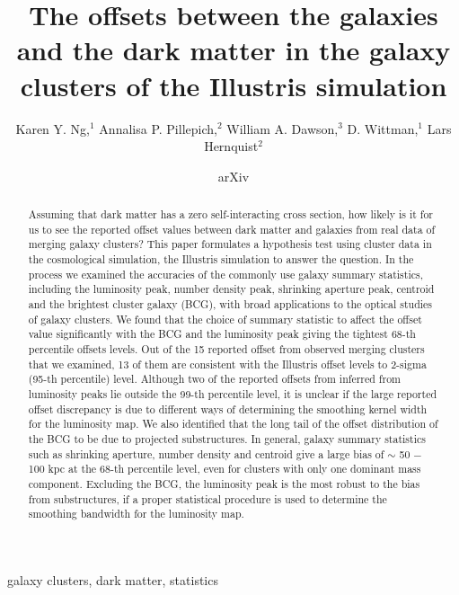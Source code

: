 \documentclass[usenatbib]{mn2e}
\title[
	The offsets between the galaxies and the dark matter in the galaxy clusters of the Illustris simulation]
{The offsets between the galaxies and the dark matter	in the galaxy clusters of
the Illustris simulation}
\author[Karen Y. Ng et al.]{Karen Y. Ng,$^{1}$
	Annalisa P. Pillepich,$^{2}$ 
	William A. Dawson,$^{3}$ 
	D. Wittman,$^{1}$
	\newauthor Lars Hernquist$^{2}$
}
\begin{document}
\date{arXiv} \pagerange{\pageref{firstpage}--\pageref{lastpage}}
 \maketitle\label{firstpage}
\begin{abstract} 
	Assuming that dark matter has a zero self-interacting cross section, how likely is
	it for us to see the reported offset values between dark matter and galaxies 
	from real data of merging galaxy clusters? 
	This paper formulates a hypothesis test using cluster data in the cosmological 
	simulation, the Illustris simulation to answer the question. 
	In the process
	we examined the accuracies of the commonly use galaxy summary 
	statistics, including the
	luminosity peak, number density peak, shrinking aperture peak, centroid and
	the brightest cluster galaxy (BCG), with broad applications to the optical studies of
	galaxy clusters. 	
	We found that the choice of summary statistic to affect the offset
	value significantly with the BCG and the luminosity peak giving the tightest
	68-th percentile offsets levels.  
	Out of the 15 reported offset from observed merging clusters
	that we examined, 13 of
	them are consistent with the Illustris offset levels to 2-sigma 
	(95-th percentile) level. Although two of the reported offsets from inferred
	from luminosity peaks lie outside the 99-th percentile level, it is unclear
	if the large reported offset discrepancy is due to different ways of
	determining the smoothing kernel width for the luminosity map. 
	We also identified that the long
	tail of the offset distribution of the BCG to be due to projected 
	substructures. In general, galaxy summary statistics such as
	shrinking aperture, number density and centroid give a large bias of $\sim$ 50
	$-$ 100 kpc at
	the 68-th percentile level, even for clusters with only one dominant 
	mass component. Excluding the BCG, 
	the luminosity peak is the most 
	robust to the bias from substructures, 
	if a proper statistical procedure is used to determine
	the smoothing bandwidth for the luminosity map.
\end{abstract}

\begin{keywords}
	galaxy clusters, dark matter, statistics 
\end{keywords}





\appendix


\clearpage\bsp\label{lastpage} 
\end{document}
